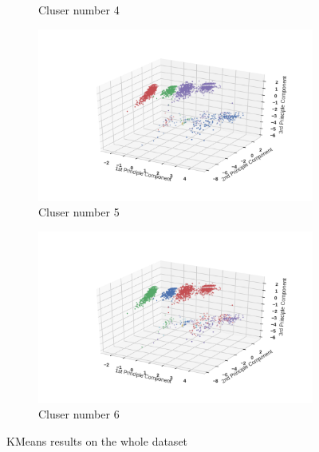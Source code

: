 \documentclass[12pt]{article}
\begin{document}
\begin{figure}
\begin{subfigure}[b]{0.31\textwidth}
        \caption{Cluser number 4}
        \label{fig:KMeans-trainbywhole-4}
    \end{subfigure}
    
    \begin{subfigure}[b]{0.31\textwidth}
        \includegraphics[width=\textwidth]{images/KMeans-trainbywhole-5.png}
        \caption{Cluser number 5}
        \label{fig:KMeans-trainbywhole-5}
    \end{subfigure}
    \begin{subfigure}[b]{0.31\textwidth}
        \includegraphics[width=\textwidth]{images/KMeans-trainbywhole-6.png}
        \caption{Cluser number 6}
        \label{fig:KMeans-trainbywhole-6}
    \end{subfigure}
    
    \caption{KMeans results on the whole dataset}\label{fig:KMeans-trainbywhole}
\end{figure}
\end{document}
